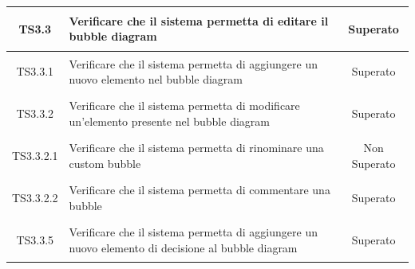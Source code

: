 \documentclass[../PianoDiQualifica.tex]{subfiles}
\begin{document}
\begin{longtable}{|c|>{\centering}p{10cm}|c|}
	\hline
	\hypertarget{TS3.3}{TS3.3} & Verificare che il sistema permetta di editare il bubble diagram & Superato \\
	\hline
	\hypertarget{TS3.3.1}{TS3.3.1} & Verificare che il sistema permetta di aggiungere un nuovo elemento nel bubble diagram & Superato \\
	\hline
	\hypertarget{TS3.3.2}{TS3.3.2} & Verificare che il sistema permetta di modificare un'elemento presente nel bubble diagram & Superato \\
	\hline
	\hypertarget{TS3.3.2.1}{TS3.3.2.1} & Verificare che il sistema permetta di rinominare una custom bubble & Non Superato\\
	\hline
	\hypertarget{TS3.3.2.2}{TS3.3.2.2} & Verificare che il sistema permetta di commentare una bubble & Superato \\
	\hline
	\hypertarget{TS3.3.5}{TS3.3.5} & Verificare che il sistema permetta di aggiungere un nuovo elemento di decisione al bubble diagram & Superato \\

\end{longtable}
\end{document}
